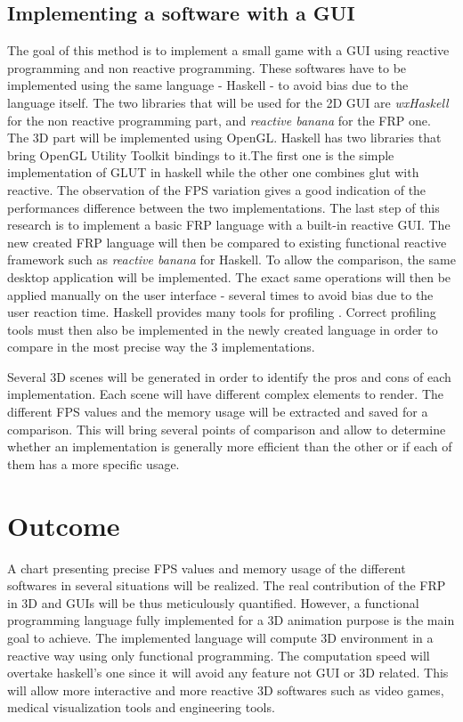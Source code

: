 \documentclass[12pt,a4paper]{scrartcl}
\begin{document}
\subsection{Implementing a software with a GUI}
The goal of this method is to implement a small game with a GUI using reactive programming and non reactive programming. These softwares have to be implemented using the same language - Haskell - to avoid bias due to the language itself. The two libraries that will be used for the 2D GUI are \textit{wxHaskell} for the non reactive programming part, and \textit{reactive banana} for the FRP one\cite{reactbanana}. The 3D part will be implemented using OpenGL. Haskell has two libraries that bring OpenGL Utility Toolkit bindings to it.The first one is the simple implementation of GLUT in haskell \cite{glut} while the other one combines glut with reactive\cite{reactglut}. The observation of the FPS variation gives a good indication of the performances difference between the two implementations.
The last step of this research is to implement a basic FRP language with a built-in reactive GUI. The new created FRP language will then be compared to existing functional reactive framework such as \textit{reactive banana} for Haskell. To allow the comparison, the same desktop application will be implemented. The exact same operations will then be applied manually on the user interface - several times to avoid bias due to the user reaction time. Haskell provides many tools for profiling \cite{o2008real}. Correct profiling tools must then also be implemented in the newly created language in order to compare in the most precise way the 3 implementations.

Several 3D scenes will be generated in order to identify the pros and cons of each implementation. Each scene will have different complex elements to render. The different FPS values and the memory usage will be extracted and saved for a comparison. This will bring several points of comparison and allow to determine whether an implementation is generally more efficient than the other or if each of them has a more specific usage.

\section{Outcome}
A chart presenting precise FPS values and memory usage of the different softwares in several situations will be realized. The real contribution of the FRP in 3D and GUIs will be thus meticulously quantified. However, a functional programming language fully implemented for a 3D animation purpose is the main goal to achieve. The implemented language will compute 3D environment in a reactive way using only functional programming. The computation speed will overtake haskell's one since it will avoid any feature not GUI or 3D related. This will allow more interactive and more reactive 3D softwares such as video games, medical visualization tools and engineering tools. 




\end{document}
